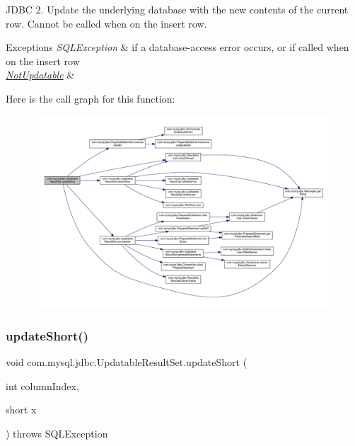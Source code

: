 J\+D\+BC 2. Update the underlying database with the new contents of the current row. Cannot be called when on the insert row.


\begin{DoxyExceptions}{Exceptions}
{\em S\+Q\+L\+Exception} & if a database-\/access error occurs, or if called when on the insert row \\
\hline
{\em \mbox{\hyperlink{classcom_1_1mysql_1_1jdbc_1_1_not_updatable}{Not\+Updatable}}} & \\
\hline
\end{DoxyExceptions}
Here is the call graph for this function\+:
\nopagebreak
\begin{figure}[H]
\begin{center}
\leavevmode
\includegraphics[width=350pt]{classcom_1_1mysql_1_1jdbc_1_1_updatable_result_set_a919969ba4b3c7cbc7b18605e9f31a746_cgraph}
\end{center}
\end{figure}
\mbox{\label{classcom_1_1mysql_1_1jdbc_1_1_updatable_result_set_a0ff435a274f3c9b111fe0733274b1a48}} 
\subsubsection{\texorpdfstring{update\+Short()}{updateShort()}\hspace{0.1cm}{\footnotesize\ttfamily [1/2]}}
{\footnotesize\ttfamily void com.\+mysql.\+jdbc.\+Updatable\+Result\+Set.\+update\+Short (\begin{DoxyParamCaption}\item[{int}]{column\+Index,  }\item[{short}]{x }\end{DoxyParamCaption}) throws S\+Q\+L\+Exception}

